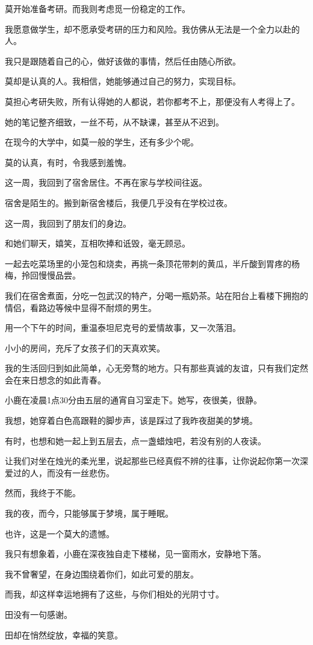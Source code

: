 		莫开始准备考研。而我则考虑觅一份稳定的工作。\par
		我愿意做学生，却不愿承受考研的压力和风险。我仿佛从无法是一个全力以赴的人。\par
		我只是跟随着自己的心，做好该做的事情，然后任由随心所欲。\par
		莫却是认真的人。我相信，她能够通过自己的努力，实现目标。\par
		莫担心考研失败，所有认得她的人都说，若你都考不上，那便没有人考得上了。\par
		她的笔记整齐细致，一丝不苟，从不缺课，甚至从不迟到。\par
		在现今的大学中，如莫一般的学生，还有多少个呢。\par
		莫的认真，有时，令我感到羞愧。

		这一周，我回到了宿舍居住。不再在家与学校间往返。\par
		宿舍是陌生的。搬到新宿舍楼后，我便几乎没有在学校过夜。\par
		这一周，我回到了朋友们的身边。\par
		和她们聊天，嬉笑，互相吹捧和诋毁，毫无顾忌。\par
		一起去吃菜场里的小笼包和烧卖，再挑一条顶花带刺的黄瓜，半斤酸到胃疼的杨梅，拎回慢慢品尝。\par
		我们在宿舍煮面，分吃一包武汉的特产，分喝一瓶奶茶。站在阳台上看楼下拥抱的情侣，看路边等候中显得不耐烦的男生。\par
		用一个下午的时间，重温泰坦尼克号的爱情故事，又一次落泪。\par
		小小的房间，充斥了女孩子们的天真欢笑。\par
		我的生活回归到如此简单，心无旁骛的地方。只有那些真诚的友谊，只有我们定然会在来日想念的如此青春。

		小鹿在凌晨1点30分由五层的通宵自习室走下。她写，夜很美，很静。\par
		我想，她穿着白色高跟鞋的脚步声，该是踩过了我昨夜甜美的梦境。\par
		有时，也想和她一起上到五层去，点一盏蜡烛吧，若没有别的人夜读。\par
		让我们对坐在烛光的柔光里，说起那些已经真假不辨的往事，让你说起你第一次深爱过的人，而没有一丝悲伤。\par
		然而，我终于不能。\par
		我的夜，而今，只能够属于梦境，属于睡眠。\par
		也许，这是一个莫大的遗憾。

		我只有想象着，小鹿在深夜独自走下楼梯，见一窗雨水，安静地下落。

		我不曾奢望，在身边围绕着你们，如此可爱的朋友。\par
		而我，却这样幸运地拥有了这些，与你们相处的光阴寸寸。\par
		田没有一句感谢。\par
		田却在悄然绽放，幸福的笑意。

